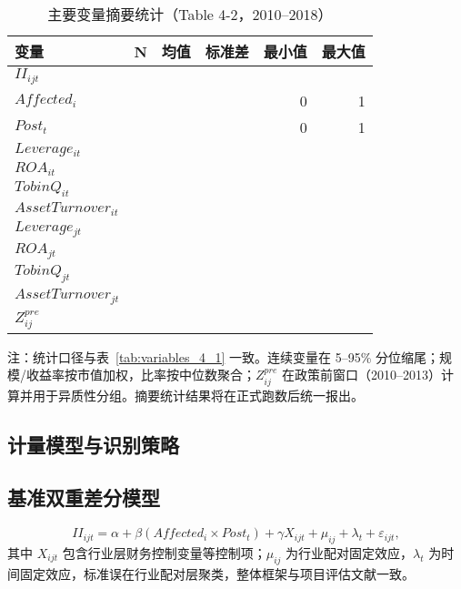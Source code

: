 \begin{table}[htbp]
\centering
\caption{主要变量摘要统计（Table 4-2，2010–2018）}
\label{tab:variables_4_2}
\begin{threeparttable}
\small
\begin{tabular}{lrrrrr}
\toprule
变量 & N & 均值 & 标准差 & 最小值 & 最大值 \\
\midrule
$II_{ijt}$ &  &  &  &  &  \\
$Affected_i$ &  &  &  & 0 & 1 \\
$Post_t$ &  &  &  & 0 & 1 \\
$Leverage_{it}$ &  &  &  &  &  \\
$ROA_{it}$ &  &  &  &  &  \\
$TobinQ_{it}$ &  &  &  &  &  \\
$AssetTurnover_{it}$ &  &  &  &  &  \\
$Leverage_{jt}$ &  &  &  &  &  \\
$ROA_{jt}$ &  &  &  &  &  \\
$TobinQ_{jt}$ &  &  &  &  &  \\
$AssetTurnover_{jt}$ &  &  &  &  &  \\
$Z^{pre}_{ij}$ &  &  &  &  &  \\
\bottomrule
\end{tabular}
\begin{tablenotes}
\footnotesize
\item 注：统计口径与表~\ref{tab:variables_4_1} 一致。连续变量在 5--95\% 分位缩尾；规模/收益率按市值加权，比率按中位数聚合；$Z^{pre}_{ij}$ 在政策前窗口（2010–2013）计算并用于异质性分组。摘要统计结果将在正式跑数后统一报出。
\end{tablenotes}
\end{threeparttable}
\end{table}

\subsection{计量模型与识别策略}
\label{sec:model_identification}

\subsection{基准双重差分模型}
\begin{equation}
    II_{ijt} = \alpha + \beta (Affected_i \times Post_t) + \gamma X_{ijt} + \mu_{ij} + \lambda_t + \varepsilon_{ijt},
    \label{eq:baseline_did}
\end{equation}
其中 \(X_{ijt}\) 包含行业层财务控制变量等控制项；\(\mu_{ij}\) 为行业配对固定效应，\(\lambda_t\) 为时间固定效应，标准误在行业配对层聚类，整体框架与项目评估文献一致\citep{imbens2009recent}。

